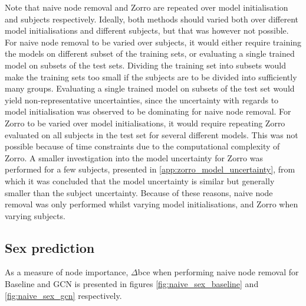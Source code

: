 Note that naive node removal and Zorro are repeated over model initialisation and subjects respectively. Ideally, both methods should varied both over different model initialisations and different subjects, but that was however not possible. For naive node removal to be varied over subjects, it would either require training the models on different subset of the training sets, or evaluating a single trained model on subsets of the test sets. Dividing the training set into subsets would make the training sets too small if the subjects are to be divided into sufficiently many groups. Evaluating a single trained model on subsets of the test set would yield non-representative uncertainties, since the uncertainty with regards to model initialisation was observed to be dominating for naive node removal. For Zorro to be varied over model initialisations, it would require repeating Zorro evaluated on all subjects in the test set for several different models. This was not possible because of time constraints due to the computational complexity of Zorro. A smaller investigation into the model uncertainty for Zorro was performed for a few subjects, presented in \cref{app:zorro_model_uncertainty}, from which it was concluded that the model uncertainty is similar but generally smaller than the subject uncertainty. Because of these reasons, naive node removal was only performed whilst varying model initialisations, and Zorro when varying subjects. 


\subsection{Sex prediction}
\label{sec:results_analysis_sex}
As a measure of node importance, $\Delta$\acrshort{bce} when performing naive node removal for Baseline and GCN is presented in figures \ref{fig:naive_sex_baseline} and \ref{fig:naive_sex_gcn} respectively.


